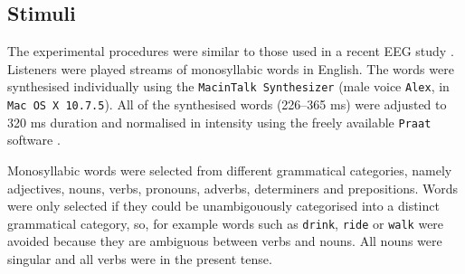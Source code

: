 \documentclass[11pt,a4wide]{article}
\newcommand{\citet}[1]{\cite{#1}}
\begin{document}
\subsection*{Stimuli}

The experimental procedures were similar to those used in a recent EEG
study \cite{DingEtAl2017}. Listeners were played streams of
monosyllabic words in English. The words were synthesised individually
using the \texttt{MacinTalk Synthesizer} (male voice \texttt{Alex}, in
\texttt{Mac OS X 10.7.5}). All of the synthesised words (226--365 ms)
were adjusted to 320 ms duration and normalised in intensity using the
freely available \texttt{Praat} software \citet{Praat}.

Monosyllabic words were selected from different grammatical categories,
namely adjectives, nouns, verbs, pronouns, adverbs, determiners and
prepositions. Words were only selected if they could be unambigouously
categorised into a distinct grammatical category, so, for example
words such as \texttt{drink}, \texttt{ride} or \texttt{walk} were
avoided because they are ambiguous between verbs and nouns. All nouns
were singular and all verbs were in the present tense.
\end{document}
